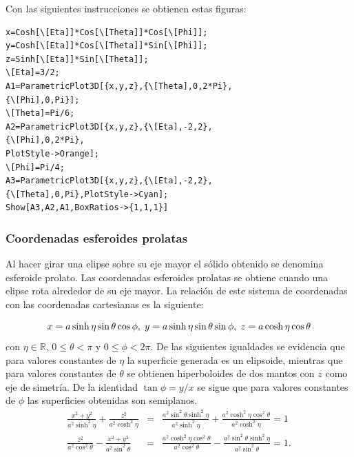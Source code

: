 Con las siguientes instrucciones se obtienen estas figuras:

\begin{tcolorbox}[title=\bf Instrucción \verb"Mathematica"]\begin{Verbatim}[formatcom=\letraverbatim]
x=Cosh[\[Eta]]*Cos[\[Theta]]*Cos[\[Phi]];
y=Cosh[\[Eta]]*Cos[\[Theta]]*Sin[\[Phi]];
z=Sinh[\[Eta]]*Sin[\[Theta]];
\[Eta]=3/2;
A1=ParametricPlot3D[{x,y,z},{\[Theta],0,2*Pi},
{\[Phi],0,Pi}];
\[Theta]=Pi/6;
A2=ParametricPlot3D[{x,y,z},{\[Eta],-2,2},
{\[Phi],0,2*Pi},
PlotStyle->Orange];
\[Phi]=Pi/4;
A3=ParametricPlot3D[{x,y,z},{\[Eta],-2,2},
{\[Theta],0,Pi},PlotStyle->Cyan];
Show[A3,A2,A1,BoxRatios->{1,1,1}]
\end{Verbatim}
\end{tcolorbox}

\subsubsection{Coordenadas esferoides prolatas} 

Al hacer girar una elipse sobre su eje mayor el sólido obtenido se denomina
esferoide prolato.
Las coordenadas esferoides prolatas se obtiene cuando una elipse rota alrededor de su eje mayor.
La relación de este sistema de coordenadas con las coordenadas cartesianas es la siguiente:

\begin{equation}
x = a\sinh \eta \sin \theta \cos \phi,\hskip0.1cm y = a\sinh \eta \sin \theta \sin \phi, \hskip0.1cm z=a\cosh \eta \cos \theta
\end{equation}
con $\eta \in \mathbb{R}$, $0\leq \theta <\pi$ y $0\leq \phi < 2\pi$.
De las siguientes igualdades se evidencia que para valores constantes de $\eta$ la superficie
generada es un elipsoide, mientras que para valores constantes de $\theta$ se obtienen hiperboloides
de dos mantos con $z$ como eje de simetría.
De la identidad $\tan \phi = y/x$ se sigue que para valores constantes de $\phi$ las superficies obtenidas son semiplanos.
{\small
\begin{eqnarray*}
\frac{x^{2}+y^{2}}{a^{2}\sinh ^{2}\eta}+\frac{z^{2}}{a^{2}\cosh^{2}\eta} &=&
\frac{a^{2}\sin ^{2}\theta \sinh ^{2}\eta }{a^{2}\sinh ^{2}\eta}+\frac{a^{2}\cosh^{2}\eta\cos^{2}\theta}{a^{2}\cosh^{2}\eta}= 1 \\[0.2cm]
\frac{z^{2}}{a^{2}\cos ^{2}\theta }-\frac{x^{2}+y^{2}}{a^{2}\sin ^{2}\theta}
&=& \frac{a^{2}\cosh ^{2}\eta \cos ^{2}\theta }{a^{2}\cos^{2}\theta }-\frac{a^{2}\sin ^{2}\theta \sinh ^{2}\eta }{a^{2}\sin^{2}\theta }= 1.
\end{eqnarray*}
}

